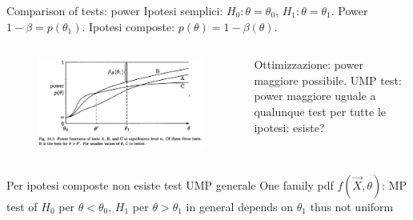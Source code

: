\documentclass[asd-beamer.tex]{subfiles}
\begin{document}
\begin{frame}{Comparison of tests: power}
Ipotesi semplici: $H_0: \theta=\theta_0$, $H_1: \theta=\theta_1$. Power $1-\beta=p(\theta_1)$.
Ipotesi composte: $p(\theta)=1-\beta(\theta)$.
\begin{columns}[T]
\begin{column}{0.4\textwidth}
\begin{figure}[!ht]\includegraphics[trim={0cm 0cm 0 0},clip, keepaspectratio,width=0.99\textwidth]{figures/james/test/mostpower}\label{fig:mostpower}
\end{figure}
\end{column}
\begin{column}{0.6\textwidth}
\begin{block}{Ottimizzazione: power maggiore possibile.}
	UMP test: power maggiore uguale a qualunque test per tutte le ipotesi: esiste?
\end{block}
\end{column}
\end{columns}
\begin{block}{Per ipotesi composte non esiste test UMP generale}
	One family pdf $f(\vec{X},\theta)$: MP test of $H_0$ per $\theta<\theta_0$, $H_1$ per $\theta>\theta_1$ in general depends on $\theta_1$ thus not uniform
\end{block}
\end{frame}
\end{document}
